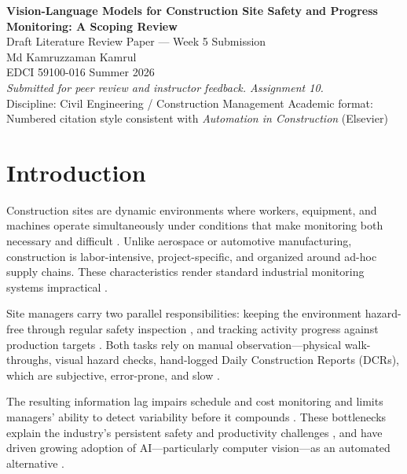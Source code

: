 \documentclass[10pt,letterpaper]{article}
\begin{document}
\begin{center}
{\Large\bfseries\color{headingblue} Vision-Language Models for Construction Site Safety and Progress Monitoring: A Scoping Review}\\[0.4em]
{\normalsize Draft Literature Review Paper --- Week 5 Submission}\\[0.2em]
{\normalsize Md Kamruzzaman Kamrul}\\
{\normalsize EDCI 59100-016 \textbar{} Summer 2026}\\[0.2em]
{\small \textit{Submitted for peer review and instructor feedback. Assignment 10.}}\\[0.25em]
{\small Discipline: Civil Engineering / Construction Management \textbar{} Academic format: Numbered citation style consistent with \textit{Automation in Construction} (Elsevier)}
\end{center}

\vspace{0.5em}

\section{Introduction}

Construction sites are dynamic environments where workers, equipment, and machines operate simultaneously under conditions that make monitoring both necessary and difficult \cite{alaloul2022}. Unlike aerospace or automotive manufacturing, construction is labor-intensive, project-specific, and organized around ad-hoc supply chains. These characteristics render standard industrial monitoring systems impractical \cite{davila2021,alaloul2022}.

Site managers carry two parallel responsibilities: keeping the environment hazard-free through regular safety inspection \cite{asadzadeh2020}, and tracking activity progress against production targets \cite{alaloul2022}. Both tasks rely on manual observation---physical walk-throughs, visual hazard checks, hand-logged Daily Construction Reports (DCRs), which are subjective, error-prone, and slow \cite{samsami2024,alaloul2022}.

The resulting information lag impairs schedule and cost monitoring and limits managers' ability to detect variability before it compounds \cite{alaloul2022}. These bottlenecks explain the industry's persistent safety and productivity challenges \cite{jiang2023}, and have driven growing adoption of AI---particularly computer vision---as an automated alternative \cite{rabbi2024,paneru2021}.
\end{document}
